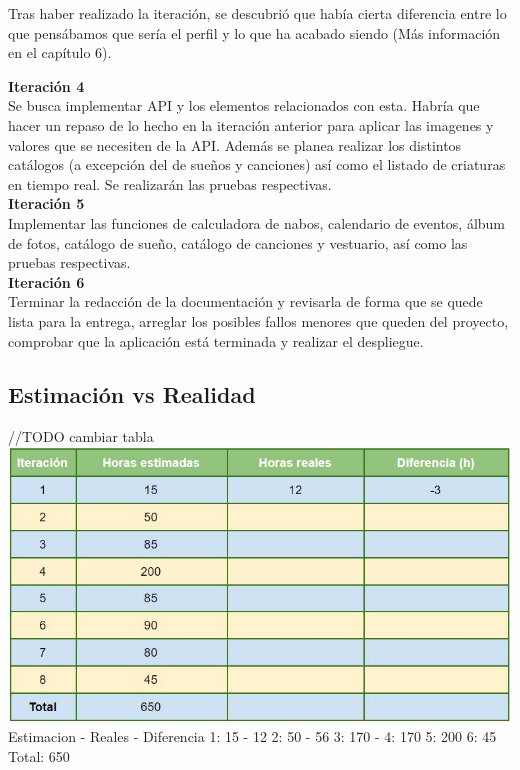 Tras haber realizado la iteración, se descubrió que había cierta diferencia entre lo que pensábamos que sería el perfil y lo que ha acabado siendo (Más información en el capítulo 6).

\textbf{Iteración 4}\\

Se busca implementar API y los elementos relacionados con esta. Habría que hacer un repaso de lo hecho en la iteración anterior para aplicar las imagenes y valores que se necesiten de la API. Además se planea realizar los distintos catálogos (a excepción del de sueños y canciones) así como el listado de criaturas en tiempo real. Se realizarán las pruebas respectivas.\\

\textbf{Iteración 5}\\

Implementar las funciones de calculadora de nabos, calendario de eventos, álbum de fotos, catálogo de sueño, catálogo de canciones y vestuario, así como las pruebas respectivas.\\

\textbf{Iteración 6}\\

Terminar la redacción de la documentación y revisarla de forma que se quede lista para la entrega, arreglar los posibles fallos menores que queden del proyecto, comprobar que la aplicación está terminada y realizar el despliegue.\\

\subsection{Estimación vs Realidad}

//TODO cambiar tabla
\includegraphics[width=\textwidth]{img/cap4/analisistiempo.jpg}
	Estimacion  -  Reales  -  Diferencia
1:      15      -    12
2:      50	    -    56
3:	   170      -
4:	   170
5:     200
6:     45
Total: 650

